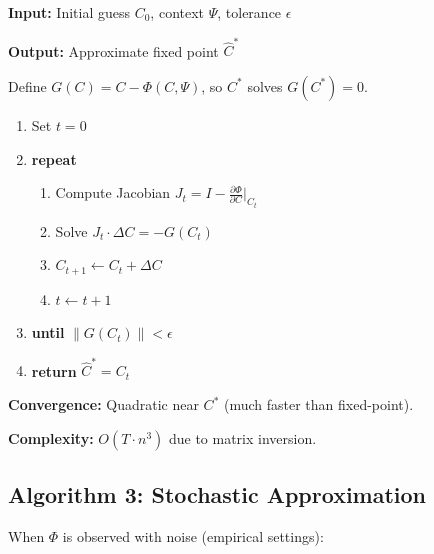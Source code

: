 \begin{tcolorbox}[colback=gray!5!white, colframe=gray!75!black,
    title=Algorithm AZ-C2: Newton-Raphson for $C^*$]
\textbf{Input:} Initial guess $C_0$, context $\Psi$, tolerance $\epsilon$

\textbf{Output:} Approximate fixed point $\hat{C}^*$

Define $G(C) = C - \Phi(C, \Psi)$, so $C^*$ solves $G(C^*) = 0$.

\begin{enumerate}[nosep]
\item Set $t = 0$
\item \textbf{repeat}
    \begin{enumerate}[nosep]
    \item Compute Jacobian $J_t = I - \frac{\partial \Phi}{\partial C}\big|_{C_t}$
    \item Solve $J_t \cdot \Delta C = -G(C_t)$
    \item $C_{t+1} \leftarrow C_t + \Delta C$
    \item $t \leftarrow t + 1$
    \end{enumerate}
\item \textbf{until} $\|G(C_t)\| < \epsilon$
\item \textbf{return} $\hat{C}^* = C_t$
\end{enumerate}

\textbf{Convergence:} Quadratic near $C^*$ (much faster than fixed-point).

\textbf{Complexity:} $O(T \cdot n^3)$ due to matrix inversion.
\end{tcolorbox}

\subsection{Algorithm 3: Stochastic Approximation}

When $\Phi$ is observed with noise (empirical settings):


